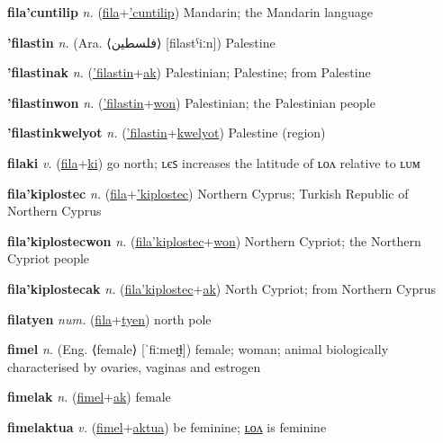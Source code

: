 \textbf{\hypertarget{fila'cuntilip}{fila'cuntilip}} \textit{n.} (\hyperlink{fila}{fila}+\allowbreak \hyperlink{'cuntilip}{'cuntilip})
Mandarin; the Mandarin language

\textbf{\hypertarget{'filastin}{'filastin}} \textit{n.} (Ara. ⟨{\arabics{}فلسطين}⟩ [filastˁiːn])
Palestine

\textbf{\hypertarget{'filastinak}{'filastinak}} \textit{n.} (\hyperlink{'filastin}{'filastin}+\allowbreak \hyperlink{ak}{ak})
Palestinian; Palestine; from Palestine

\textbf{\hypertarget{'filastinwon}{'filastinwon}} \textit{n.} (\hyperlink{'filastin}{'filastin}+\allowbreak \hyperlink{won}{won})
Palestinian; the Palestinian people

\textbf{\hypertarget{'filastinkwelyot}{'filastinkwelyot}} \textit{n.} (\hyperlink{'filastin}{'filastin}+\allowbreak \hyperlink{kwelyot}{kwelyot})
Palestine (region)

\textbf{\hypertarget{filaki}{filaki}} \textit{v.} (\hyperlink{fila}{fila}+\allowbreak \hyperlink{ki}{ki})
go north; ʟєꜱ increases the latitude of ʟᴏᴧ relative to ʟᴜᴍ

\textbf{\hypertarget{fila'kiplostec}{fila'kiplostec}} \textit{n.} (\hyperlink{fila}{fila}+\allowbreak \hyperlink{'kiplostec}{'kiplostec})
Northern Cyprus; Turkish Republic of Northern Cyprus

\textbf{\hypertarget{fila'kiplostecwon}{fila'kiplostecwon}} \textit{n.} (\hyperlink{fila'kiplostec}{fila'kiplostec}+\allowbreak \hyperlink{won}{won})
Northern Cypriot; the Northern Cypriot people

\textbf{\hypertarget{fila'kiplostecak}{fila'kiplostecak}} \textit{n.} (\hyperlink{fila'kiplostec}{fila'kiplostec}+\allowbreak \hyperlink{ak}{ak})
North Cypriot; from Northern Cyprus

\textbf{\hypertarget{filatyen}{filatyen}} \textit{num.} (\hyperlink{fila}{fila}+\allowbreak \hyperlink{tyen}{tyen})
north pole

\textbf{\hypertarget{fimel}{fimel}} \textit{n.} (Eng. ⟨female⟩ [ˈfiːmeɪ̯ɫ])
female; woman; animal biologically characterised by ovaries, vaginas and estrogen

\textbf{\hypertarget{fimelak}{fimelak}} \textit{n.} (\hyperlink{fimel}{fimel}+\allowbreak \hyperlink{ak}{ak})
female

\textbf{\hypertarget{fimelaktua}{fimelaktua}} \textit{v.} (\hyperlink{fimel}{fimel}+\allowbreak \hyperlink{aktua}{aktua})
be feminine; \hyperlink{fimelaktualon}{ʟᴏᴧ} is feminine

